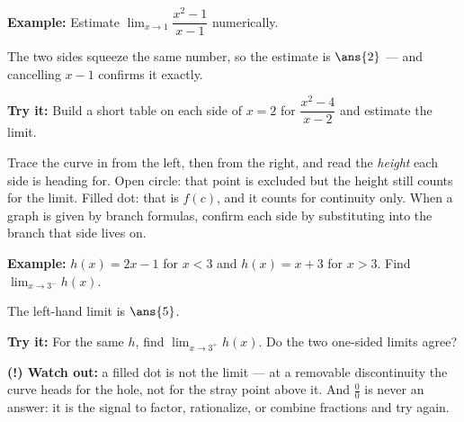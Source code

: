 \documentclass[12pt]{article}
\begin{document}
\begin{examplebox}
\textbf{Example:} Estimate $\lim_{x\to 1}\dfrac{x^2-1}{x-1}$ numerically.

The two sides squeeze the same number, so the estimate is $\ans{2}$ --- and
cancelling $x-1$ confirms it exactly.
\end{examplebox}

\begin{tryitbox}
\textbf{Try it:} Build a short table on each side of $x=2$ for
$\dfrac{x^2-4}{x-2}$ and estimate the limit.\\[2pt]
\end{tryitbox}


\begin{formulabox}
Trace the curve in from the left, then from the right, and read the
\emph{height} each side is heading for. Open circle: that point is excluded but
the height still counts for the limit. Filled dot: that is $f(c)$, and it
counts for continuity only. When a graph is given by branch formulas, confirm
each side by substituting into the branch that side lives on.
\end{formulabox}

\begin{examplebox}
\textbf{Example:} $h(x)=2x-1$ for $x<3$ and $h(x)=x+3$ for $x>3$. Find
$\lim_{x\to 3^-}h(x)$.

The left-hand limit is $\ans{5}$.
\end{examplebox}

\begin{tryitbox}
\textbf{Try it:} For the same $h$, find $\lim_{x\to 3^+}h(x)$. Do the two
one-sided limits agree?\\[2pt]
\end{tryitbox}

\begin{watchoutbox}
\textbf{(!) Watch out:} a filled dot is not the limit --- at a removable
discontinuity the curve heads for the hole, not for the stray point above it.
And $\tfrac00$ is never an answer: it is the signal to factor, rationalize, or
combine fractions and try again.
\end{watchoutbox}
\end{document}
